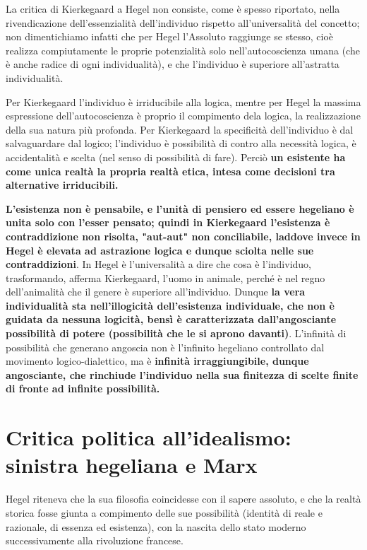 La critica di Kierkegaard a Hegel non consiste, come è spesso riportato, nella rivendicazione dell'essenzialità dell'individuo rispetto all'universalità del concetto; non dimentichiamo infatti che per Hegel l'Assoluto raggiunge se stesso, cioè realizza compiutamente le proprie potenzialità solo nell'autocoscienza umana (che è anche radice di ogni individualità), e che l'individuo è superiore all'astratta individualità.

 Per Kierkegaard l'individuo è irriducibile alla logica, mentre per Hegel la massima espressione dell'autocoscienza è proprio il compimento dela logica, la realizzazione della sua natura più profonda. Per Kierkegaard la specificità dell'individuo è dal salvaguardare dal logico; l'individuo è possibilità di contro alla necessità logica, è accidentalità e scelta (nel senso di possibilità di fare). Perciò \textbf{un esistente ha come unica realtà la propria realtà etica, intesa come decisioni tra alternative irriducibili.} 
 
 \textbf{L'esistenza non è pensabile, e l'unità di pensiero ed essere hegeliano è unita solo con l'esser pensato; quindi in Kierkegaard l'esistenza è contraddizione non risolta, "aut-aut" non conciliabile, laddove invece in Hegel è elevata ad astrazione logica e dunque sciolta nelle sue contraddizioni}. In Hegel è l'universalità  a dire che cosa è l'individuo, trasformando, afferma Kierkegaard, l'uomo in animale, perché è nel regno dell'animalità che il genere è superiore all'individuo. Dunque \textbf{la vera individualità sta nell'illogicità dell'esistenza individuale, che non è guidata da nessuna logicità, bensì è caratterizzata dall'angosciante possibilità di potere (possibilità che le si aprono davanti)}. L'infinità di possibilità che generano angoscia non è l'infinito hegeliano controllato dal movimento logico-dialettico, ma è \textbf{infinità irraggiungibile, dunque angosciante, che rinchiude l'individuo nella sua finitezza di scelte finite di fronte ad infinite possibilità.}
 
 \section{Critica politica all'idealismo: sinistra hegeliana e Marx}
 
 Hegel riteneva che la sua filosofia coincidesse con il sapere assoluto, e che la realtà storica fosse giunta a compimento delle sue possibilità (identità di reale e razionale, di essenza ed esistenza), con la nascita dello stato moderno successivamente alla rivoluzione francese.
 
